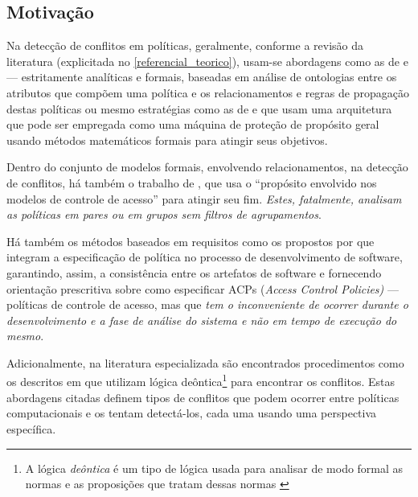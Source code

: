 \documentclass[
	12pt,				%
	openright,			%
	oneside,			%
	a4paper,			%
	english,			%
	french,				%
	spanish,			%
	brazil				%
	]{abntex2}
\begin{document}
\subsection{Motivação}\label{justificativa}
Na detecção de conflitos em políticas, geralmente, conforme a revisão da literatura (explicitada no \autoref{referencial_teorico}), usam-se abordagens como as de  e  --- estritamente analíticas e formais, baseadas em análise de ontologias entre os atributos que compõem uma política e os relacionamentos e regras de propagação destas políticas ou mesmo estratégias como as de  e  que usam uma arquitetura que pode ser empregada como uma máquina de proteção de propósito geral usando métodos matemáticos formais para atingir seus objetivos. 

Dentro do conjunto de modelos formais, envolvendo relacionamentos, na detecção de conflitos, há também o trabalho de , que usa o ``propósito envolvido nos modelos de controle de acesso'' para atingir seu fim. \textit{Estes, fatalmente, analisam as políticas em pares ou em grupos sem filtros de agrupamentos}.

Há também os métodos baseados em requisitos como os propostos por  que integram a especificação de política no processo de desenvolvimento de software, garantindo, assim, a consistência entre os artefatos de software e fornecendo orientação prescritiva sobre como especificar ACPs (\textit{Access Control Policies)} --- políticas de controle de acesso, mas que\textit{ tem o inconveniente de ocorrer durante o desenvolvimento e a fase de análise do sistema e não em tempo de execução do mesmo}.

Adicionalmente, na literatura especializada são encontrados procedimentos como os descritos em  que utilizam lógica deôntica\footnote{A lógica \textit{deôntica} é um tipo de lógica usada para analisar de modo formal as normas e as proposições que tratam dessas normas \cite{eduardo2017}} para encontrar os conflitos. Estas abordagens citadas definem tipos de conflitos que podem ocorrer entre políticas computacionais e os tentam detectá-los, cada uma usando uma perspectiva específica. 

\end{document}
